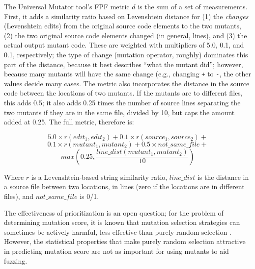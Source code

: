 The Universal Mutator \cite{regexpMut} tool's FPF metric $d$ is
the sum of a set of measurements.  First, it adds a similarity
ratio based on Levenshtein distance \cite{lev} for (1) the \emph{changes} (Levenshtein edits) from
the original source code elements to
the two mutants,  (2) the two original source code elements changed (in
general, lines), and (3) the actual output mutant code.  These are
weighted with multipliers of 5.0, 0.1, and 0.1, respectively; the type
of change (mutation operator, roughly) dominates this part of the
distance, because it best describes ``what the mutant did''; however,
because many mutants will have the same change (e.g., changing {\tt +}
to {\tt -}, the other values decide many cases.
The metric also incorporates the distance in the source
code between the locations of two mutants.  If the mutants are to
different files, this adds 0.5; it also adds 0.25
times the number of source lines separating the two mutants if they
are in the same file, divided by 10, but caps the amount added at
0.25.  The full metric, therefore is:

$$ 5.0 \times r(\mathit{edit}_1, \mathit{edit}_2) + 0.1 \times r(\mathit{source}_1, \mathit{source}_2) +$$
$$0.1 \times r(\mathit{mutant}_1, \mathit{mutant}_2) + 0.5 \times \mathit{not\_same\_file} +$$
$$max(0.25, \frac{\mathit{line\_dist}(\mathit{mutant}_1, \mathit{mutant}_2)}{10})$$

\noindent Where $r$ is a Levenshtein-based string similarity ratio,
$\mathit{line\_dist}$ is the distance in a source file between
two locations, in lines (zero if the locations are in different
files), and $\mathit{not\_same\_file}$ is 0/1.

The effectiveness of prioritization is an open question; for the problem of determining mutation score, it is known that mutation selection strategies can sometimes be actively harmful, less effective than purely random selection \cite{MutReduct}.  However, the statistical properties that make purely random selection attractive in predicting mutation score are not as important for using mutants to aid fuzzing.

